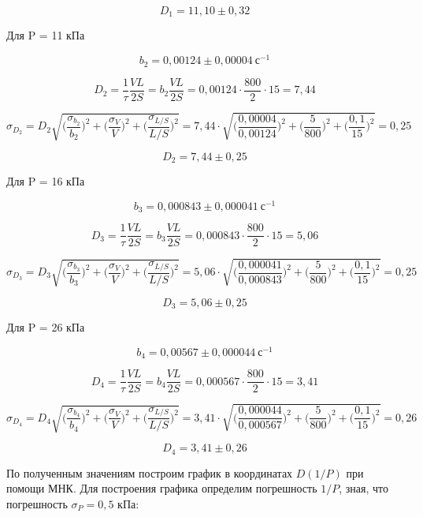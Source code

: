 \documentclass[11pt]{article}
\begin{document}
\[D_1 = 11,10 \pm 0,32\]

\vspace{0.5cm}

Для P = 11 кПа

\[b_2 = 0,00124 \pm 0,00004 \: \textit{с}^{-1}\]

\[D_2 = \frac{1}{\tau} \frac{VL}{2S} = b_2 \frac{VL}{2S} = 0,00124 \cdot \frac{800}{2} \cdot 15 = 7,44\]

\[\sigma_{D_2} = D_2 \sqrt{\Big( \frac{\sigma_{b_2}}{b_2} \Big)^2 + \Big( \frac{\sigma_V}{V} \Big)^2 + \Big( \frac{\sigma_{L/S}}{L/S} \Big)^2} = 7,44 \cdot \sqrt{\Big( \frac{0,00004}{0,00124} \Big)^2 + \Big( \frac{5}{800} \Big)^2 + \Big( \frac{0,1}{15} \Big)^2} = 0,25\]

\[D_2 = 7,44 \pm 0,25\]

\vspace{0.5cm}

Для P = 16 кПа

\[b_3 = 0,000843 \pm 0,000041 \: \textit{с}^{-1}\]

\[D_3 = \frac{1}{\tau} \frac{VL}{2S} = b_3 \frac{VL}{2S} = 0,000843 \cdot \frac{800}{2} \cdot 15 = 5,06\]

\[\sigma_{D_3} = D_3 \sqrt{\Big( \frac{\sigma_{b_3}}{b_3} \Big)^2 + \Big( \frac{\sigma_V}{V} \Big)^2 + \Big( \frac{\sigma_{L/S}}{L/S} \Big)^2} = 5,06 \cdot \sqrt{\Big( \frac{0,000041}{0,000843} \Big)^2 + \Big( \frac{5}{800} \Big)^2 + \Big( \frac{0,1}{15} \Big)^2} = 0,25\]

\[D_3 = 5,06 \pm 0,25\]

\vspace{0.5cm}

Для P = 26 кПа

\[b_4 = 0,00567 \pm 0,000044 \: \textit{с}^{-1}\]

\[D_4 = \frac{1}{\tau} \frac{VL}{2S} = b_4 \frac{VL}{2S} = 0,000567 \cdot \frac{800}{2} \cdot 15 = 3,41\]

\[\sigma_{D_4} = D_4 \sqrt{\Big( \frac{\sigma_{b_4}}{b_4} \Big)^2 + \Big( \frac{\sigma_V}{V} \Big)^2 + \Big( \frac{\sigma_{L/S}}{L/S} \Big)^2} = 3,41 \cdot \sqrt{\Big( \frac{0,000044}{0,000567} \Big)^2 + \Big( \frac{5}{800} \Big)^2 + \Big( \frac{0,1}{15} \Big)^2} = 0,26\]

\[D_4 = 3,41 \pm 0,26\]

\vspace{0.5cm}

По полученным значениям построим график в координатах $D(1/P)$ при помощи МНК. Для построения графика определим погрешность $1/P$, зная, что погрешность $\sigma_P = 0,5$ кПа:
\end{document}
